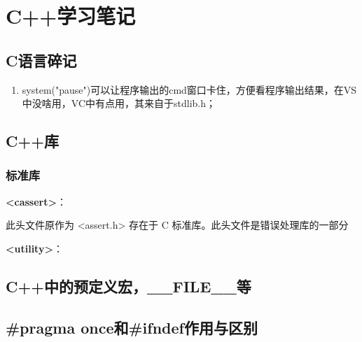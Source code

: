 \chapter{C++学习笔记}
\section{C语言碎记}
\begin{enumerate}
\item system("pause")可以让程序输出的cmd窗口卡住，方便看程序输出结果，在VS中没啥用，VC中有点用，其来自于stdlib.h；

\end{enumerate}

\section{C++库}
\subsection{标准库}
{\bf <cassert>}：

此头文件原作为 <assert.h> 存在于 C 标准库。此头文件是错误处理库的一部分

{\bf <utility>}：

\section{C++中的预定义宏，\_\_FILE\_\_等}

\section{\#pragma once和\#ifndef作用与区别}


